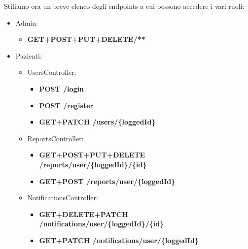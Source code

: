 \documentclass[a4paper]{article}
\begin{document}
Stiliamo ora un breve elenco degli endpoints a cui possono accedere i vari ruoli:
\begin{itemize}
  \item Admin:
  \begin{itemize}
    \item \textbf{GET+POST+PUT+DELETE/**}
  \end{itemize}

  \item Pazienti:
  \begin{itemize}
    \item UsersController: 
    \begin{itemize}
      \item \textbf{POST /login}
      \item \textbf{POST /register}
      \item \textbf{GET+PATCH /users/\{loggedId\}}
    \end{itemize}
    \item ReportsController: \begin{itemize}
      \item \textbf{GET+POST+PUT+DELETE /reports/user/\{loggedId\}/\{id\}}
      \item \textbf{GET+POST /reports/user/\{loggedId\}}
    \end{itemize}
    \item NotificationsController: 
    \begin{itemize}
      \item \textbf{GET+DELETE+PATCH /notifications/user/\{loggedId\}/\{id\}}
      \item \textbf{GET+PATCH /notifications/user/\{loggedId\}}
    \end{itemize}
  \end{itemize}


\end{itemize}
\end{document}
